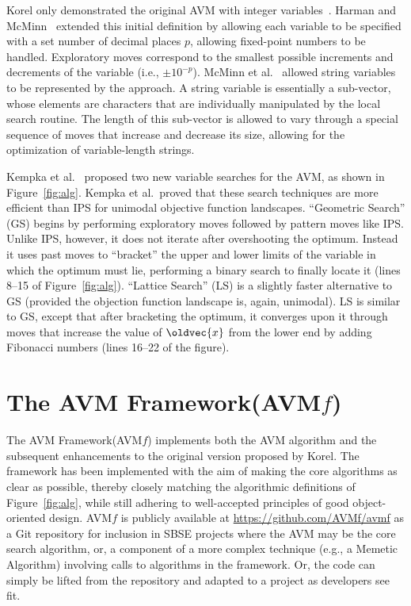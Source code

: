 \documentclass{llncs}
\let\vec\oldvec %
\newcommand{\longname}{AVM Framework\xspace}
\newcommand{\name}{AVM\hspace{-1pt}$f$\xspace}
\newcommand{\repourl}{\url{https://github.com/AVMf/avmf}\xspace}
\newcommand{\inlineheading}[1]{\vspace{1mm} \noindent {\bf #1.}}
\begin{document}
\inlineheading{New Representations}
Korel only demonstrated the original AVM with integer variables~\cite{Korel1990}. Harman and McMinn~\cite{Harman2007} extended this initial definition by allowing each variable to be specified with a set number of decimal places $p$, allowing fixed-point numbers to be handled. Exploratory moves correspond to the smallest possible increments and decrements of the variable (i.e., $\pm10^{-p}$). McMinn et al.~\cite{McMinn2015} allowed string variables to be represented by the approach. A string variable is essentially a sub-vector, whose elements are characters that are individually manipulated by the local search routine. The length of this sub-vector is allowed to vary through a special sequence of moves that increase and decrease its size, allowing for the optimization of variable-length strings.

\inlineheading{New Variable Search Algorithms}
Kempka et al.~\cite{Kempka2013,Kempka2015} proposed two new variable searches for the AVM, as shown in Figure~\ref{fig:alg}. Kempka et al.\ proved that these search techniques are more efficient than IPS for unimodal objective function landscapes. ``Geometric Search'' (GS) begins by performing exploratory moves followed by pattern moves like IPS. Unlike IPS, however, it does not iterate after overshooting the optimum. Instead it uses past moves to  ``bracket'' the upper and lower limits of the variable in which the optimum must lie, performing a binary search to finally locate it (lines 8--15 of Figure~\ref{fig:alg}). ``Lattice Search'' (LS) is a slightly faster alternative to GS (provided the objection function landscape is, again, unimodal). LS is similar to GS, except that after bracketing the optimum, it converges upon it through moves that increase the value of $\vec{x}$ from the lower end by adding Fibonacci numbers (lines 16--22 of the figure).

\vspace{-1em}
\section{The \longname (\name)}
\vspace{-1ex}
\label{sec:avmf}

The \longname (\name) implements both the AVM algorithm and the subsequent enhancements to the original version proposed by Korel. The framework has been implemented with the aim of making the core algorithms as clear as possible, thereby closely matching the algorithmic definitions of Figure~\ref{fig:alg}, while still adhering to well-accepted principles of good object-oriented design. \name is publicly available at \repourl as a Git repository for inclusion in SBSE projects where the AVM may be the core search algorithm, or, a component of a more complex technique (e.g., a Memetic Algorithm) involving calls to algorithms in the framework. Or, the code can simply be lifted from the repository and adapted to a project as developers see fit.
\end{document}
